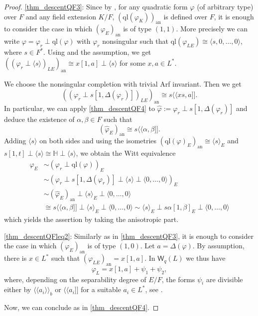 \documentclass{amsart}
\numberwithin{equation}{section}
\newcommand{\qf}[1]{\langle #1\rangle}
\newcommand{\an}{\mathrm{an}} %
\newcommand{\ql}[1]{\mathrm{ql}\left(#1\right)}
\newcommand{\qpf}[1]{\langle\!\langle #1]\!]}
\newcommand{\bipf}[1]{\langle\!\langle #1\rangle\!\rangle_b}
\renewcommand{\H}{\mathbb{H}}
\newcommand{\W}{\mathsf{W}}
\begin{document}
\begin{proof}
    \ref{thm_descentQF3}: 
    Since by \cite[Lemma 2.2]{HL04}, for any quadratic form $\varphi$ (of arbitrary type) over $F$ and any field extension $K/F$, $(\ql{\varphi_K})_\an$ is defined over $F$, it is enough to consider the case in which $(\varphi_E)_\an$ is of type $(1, 1)$.
    More precisely we can write $\varphi = \varphi_r \perp \ql \varphi$ with $\varphi_r$ nonsingular such that $\ql{\varphi_{LE}} \cong \qf{s, 0, \ldots, 0}$, where $s \in F^\ast$.
    Using \cite[Lemma 2.6]{HL04} and the assumption, we get $((\varphi_r \perp \qf{s})_{LE})_\an \cong x[1, a] \perp \qf s$ for some $x, a \in L^\ast$.
    
    We choose the nonsingular completion with trivial Arf invariant.
    Then we get
    \[((\varphi_r \perp s[1, \Delta(\varphi_r)])_{LE})_\an \cong s\qpf{xs, a}.\]
    In particular, we can apply \ref{thm_descentQF4} to $\widehat \varphi:= \varphi_r \perp s[1, \Delta(\varphi_r)]$ and deduce the existence of $\alpha, \beta \in F$ such that
    \[(\widehat \varphi_E)_\an \cong s\qpf{\alpha, \beta}.\]
    Adding $\qf s$ on both sides and using the isometries $(\ql\varphi_E)_\an \cong \qf s_E$ and $s[1, t] \perp \qf s \cong \H \perp \qf s$, we obtain the Witt equivalence
    \begin{align*}
        \varphi_E&\sim (\varphi_r \perp \ql\varphi)_E \\
        &\sim (\varphi_r \perp s[1, \Delta(\varphi_r)]  \perp \qf s \perp \qf{0, \ldots, 0})_E\\
        &\sim (\widehat \varphi_E)_\an \perp \qf s_E \perp \qf{0, \ldots, 0} \\
        &\cong s\qpf{\alpha, \beta} \perp \qf s_E \perp \qf{0, \ldots, 0} \sim \qf s_E \perp s\alpha[1, \beta]_E \perp \qf{0, \ldots, 0}
    \end{align*}
    which yields the assertion by taking the anisotropic part.
    
    \ref{thm_descentQFleq2}: 
    Similarly as in \ref{thm_descentQF3}, it is enough to consider the case in which $(\varphi_E)_\an$ is of type $(1, 0)$.
    Let $a = \Delta(\varphi)$.
    By assumption, there is $x \in L^\ast$ such that $(\varphi_{LE})_\an = x[1, a]$.
    In $\W_q(L)$ we thus have
    \[\varphi_{L} = x[1, a] + \psi_1 + \psi_2,\]
    where, depending on the separability degree of $E / F$, the forms $\psi_i$ are divisible either by $\bipf{a_i}$ or $\qpf{a_i}$ for a suitable $a_i \in L^\ast$, see \cite[Theorems 2.1, 2.2]{Ahmad04}.
    
    Now, we can conclude as in \ref{thm_descentQF4}. 
\end{proof}
\end{document}
